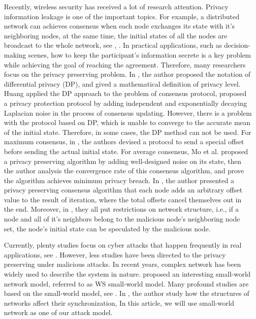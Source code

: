 \documentclass[10pt,journal,compsoc]{IEEEtran}
\begin{document}
Recently, wireless security has received a lot of research attention. Privacy information leakage is one of the important topics. For example, a distributed network can achieves consensus when each node exchanges its state with it's neighboring nodes, at the same time, the initial states of all the nodes are broadcast to the whole network, see \cite{Mo2016Privacy}, \cite{Kolesnikov2009Advances}. In practical applications, such as decision-making scenes, how to keep the participant's information secrete is a key problem while achieving the goal of reaching the agreement. Therefore, many researchers focus on the privacy preserving problem. In \cite{Dwork2006Differential}, the author proposed the notation of differential privacy (DP), and gived a mathematical definition of privacy level. Huang applied the DP approach to the problem of consensus protocol, \cite{Huang2012Differentially} proposed a privacy protection protocol by adding independent and exponentially decaying Laplacian noise in the process of consensus updating. However, there is a problem with the protocol based on DP, which is unable to converge to the accurate mean of the initial state. Therefore, in some cases, the DP method can not be used. For maximum consensus, in \cite{Duan2015Privacy}, the authors devised a protocol to send a special offset before sending the actual initial state. For average consensus, Mo et al.\cite{Mo2016Privacy} proposed a privacy preserving algorithm by adding well-designed noise on its state, then the author analysis the convergence rate of this consensus algorithm, and prove the algorithm achieves minimum privacy breach. In \cite{Manitara2013Privacy}, the author presented a privacy preserving consensus algorithm that each node adds an arbitrary offset value to the result of iteration, where the total offsets cancel themselves out in the end. Moreover, in \cite{Mo2016Privacy, Manitara2013Privacy}, they all put restrictions on network structure, i.e., if a node and all of it's neighbors belong to the malicious node's neighboring node set, the node's initial state can be speculated by the malicious node.

Currently, plenty studies focus on cyber attacks that happen frequently in real applications, see \cite{Kefayati2007Secure,Zhang2014Online,Qi2015,Lei2016Fast}. However, less studies have been directed to the privacy preserving under malicious attacks. In recent years, complex network has been widely used to describe the system in nature. \cite{Watts1998Collective} proposed an interesting small-world network model, referred to as WS small-world model. Many profound studies are based on the small-world model, see \cite{Hong2002Synchronization,Wang2003Complex}. In \cite{XIAO2011SYNCHRONIZATION}, the author study how the structures of networks affect their synchronization, In this article,  we will use small-world network as one of our attack model.
\end{document}
